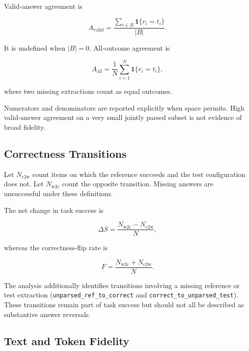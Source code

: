 \documentclass[conference]{IEEEtran}
\begin{document}
Valid-answer agreement is

\begin{equation}
A_{\mathrm{valid}} =
\frac{
\sum_{i\in B}\mathbf{1}\{r_i=t_i\}
}{
|B|
}.
\label{eq:valid}
\end{equation}

It is undefined when $|B|=0$.
All-outcome agreement is

\begin{equation}
A_{\mathrm{all}} =
\frac{1}{N}
\sum_{i=1}^{N}
\mathbf{1}\{r_i=t_i\},
\label{eq:all}
\end{equation}

where two missing extractions count as equal outcomes.

Numerators and denominators are reported explicitly when
space permits. High valid-answer agreement on a very small
jointly parsed subset is not evidence of broad fidelity.


\subsection{Correctness Transitions}

Let $N_{\mathrm{c2w}}$ count items on which the reference
succeeds and the test configuration does not.
Let $N_{\mathrm{w2c}}$ count the opposite transition.
Missing answers are unsuccessful under these definitions.

The net change in task success is

\begin{equation}
\Delta S =
\frac{
N_{\mathrm{w2c}}-N_{\mathrm{c2w}}
}{N},
\label{eq:delta}
\end{equation}

whereas the correctness-flip rate is

\begin{equation}
F =
\frac{
N_{\mathrm{w2c}}+N_{\mathrm{c2w}}
}{N}.
\label{eq:flip}
\end{equation}

The analysis additionally identifies transitions involving
a missing reference or test extraction
(\texttt{unparsed\_ref\_to\_correct} and
\texttt{correct\_to\_unparsed\_test}).
These transitions remain part of task success but should
not all be described as substantive answer reversals.


\subsection{Text and Token Fidelity}
\end{document}
